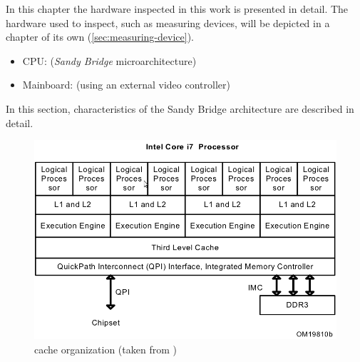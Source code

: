\label{sec:technical-prerequisites}

In this chapter the hardware inspected in this work is presented in detail. The
hardware used to inspect, such as measuring devices, will be depicted in a
chapter of its own (\ref{sec:measuring-device}).

\label{sec:hw-products}

\begin{itemize}

\item CPU: \JWPcpu (\emph{Sandy Bridge}\cite{wiki:snb} microarchitecture)

\item Mainboard: \JWPboard (using an external video controller)

\end{itemize}


\label{sec:sandy-bridge}

In this section, characteristics of the Sandy Bridge architecture are described
in detail.

\begin{figure}
  \centering
    \includegraphics[width=\textwidth]{fig/intel-cache-orga.png}
  \caption{\JWPcpu cache organization (taken from \cite{intel2011softdev1})}
  \label{fig:cache-orga}
\end{figure}


\label{sec:sandy-brige-general}

